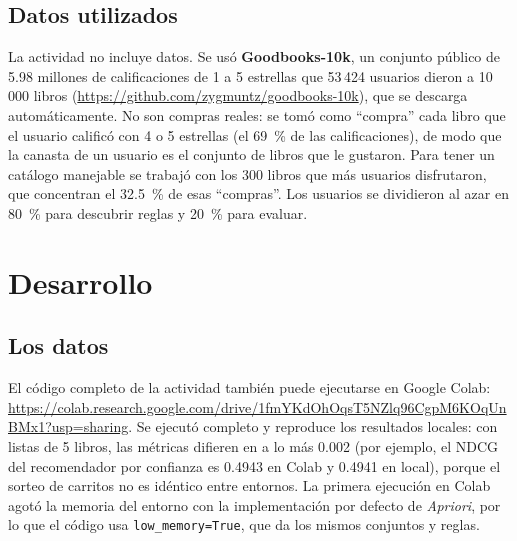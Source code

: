 \documentclass[11pt,letterpaper]{article}
\begin{document}
\subsection*{Datos utilizados}

La actividad no incluye datos. Se usó \textbf{Goodbooks-10k}, un conjunto público de 5.98 millones de calificaciones de 1 a 5 estrellas que 53\,424 usuarios dieron a 10\,000 libros (\url{https://github.com/zygmuntz/goodbooks-10k}), que se descarga automáticamente. No son compras reales: se tomó como ``compra'' cada libro que el usuario calificó con 4 o 5 estrellas (el 69~\% de las calificaciones), de modo que la canasta de un usuario es el conjunto de libros que le gustaron. Para tener un catálogo manejable se trabajó con los 300 libros que más usuarios disfrutaron, que concentran el 32.5~\% de esas ``compras''. Los usuarios se dividieron al azar en 80~\% para descubrir reglas y 20~\% para evaluar.

\section{Desarrollo}

\subsection{Los datos}

El código completo de la actividad también puede ejecutarse en Google Colab: \url{https://colab.research.google.com/drive/1fmYKdOhOqsT5NZlq96CgpM6KOqUnBMx1?usp=sharing}. Se ejecutó completo y reproduce los resultados locales: con listas de 5 libros, las métricas difieren en a lo más 0.002 (por ejemplo, el NDCG del recomendador por confianza es 0.4943 en Colab y 0.4941 en local), porque el sorteo de carritos no es idéntico entre entornos. La primera ejecución en Colab agotó la memoria del entorno con la implementación por defecto de \textit{Apriori}, por lo que el código usa \texttt{low\_memory=True}, que da los mismos conjuntos y reglas.
\end{document}
